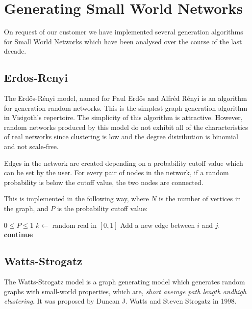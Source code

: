\documentclass[a4paper,11pt,titlepage]{article}
\let\stdsection\section         %
\renewcommand{\section}{\newpage\stdsection}
\begin{document}
\section{Generating Small World Networks}

On request of our customer we have implemented several generation
algorithms for Small World Networks which have been analysed over
the course of the last decade.

\subsection{Erdos-Renyi}
The Erd\H{o}s-R\'{e}nyi model, named for Paul Erd\"{o}s and Alfr\'{e}d R\'{e}nyi
is an algorithm for generation random networks. This is the simplest graph
generation algorithm in Visigoth's repertoire. The simplicity of this algorithm
is attractive. However, random networks produced by this model do not exhibit
all of the characteristics of real networks since clustering is low and the 
degree distribution is binomial and not scale-free.

Edges in the network are created depending on a probability cutoff value which
can be set by the user. For every pair of nodes in the network, if a random
probability is below the cutoff value, the two nodes are connected.

This is implemented in the following way, where $N$ is the number of vertices
in the graph, and $P$ is the probability cutoff value:
\begin{algorithmic}
  \REQUIRE $0 \leq P \leq 1$
      \STATE $k \gets $ random real in $[0, 1]$
        \STATE Add a new edge between $i$ and $j$.
      \ELSE
        \STATE \textbf{continue}
      \ENDIF
    \ENDFOR
  \ENDFOR
\end{algorithmic}

\subsection{Watts-Strogatz}
The Watts-Strogatz model is a graph generating model which generates random
graphs with small-world properties, which are, \emph{short average path length 
andhigh clustering}. It was proposed by Duncan J. Watts and Steven Strogatz in 
1998.
\end{document}
